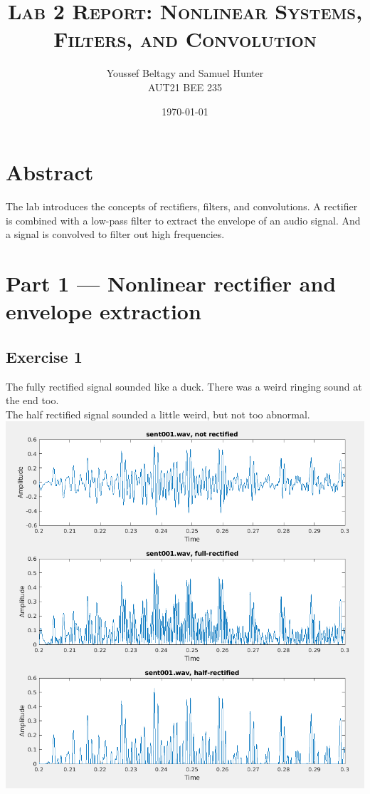 \documentclass[11pt]{article}
\title{
    \textsc{Lab 2 Report: Nonlinear Systems, Filters, and Convolution}
}
\author{
    \Large{Youssef Beltagy and Samuel Hunter} \\
    \large \textsc{AUT21 BEE 235}
}
\date{\today}
\begin{document}
\maketitle %
\pagebreak


\section{Abstract}

The lab introduces the concepts of rectifiers, filters, and convolutions.
A rectifier is combined with a low-pass filter to extract the envelope of an audio signal.
And a signal is convolved to filter out high frequencies.

\section{Part 1 --- Nonlinear rectifier and envelope extraction}

\subsection{Exercise 1}

The fully rectified signal sounded like a duck. There was a weird ringing sound at the end too.\\

The half rectified signal sounded a little weird, but not too abnormal.\\



\includegraphics[scale=0.7]{exercise1.png}
\end{document}
